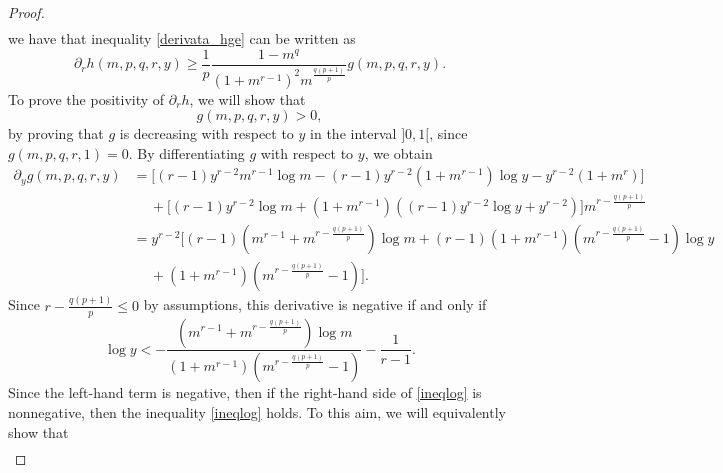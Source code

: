 \documentclass{amsart}
\theoremstyle{definition}
\theoremstyle{remark}
\newcommand{\de}{\partial}
\begin{document}
\begin{proof}
\begin{multline*}
\end{multline*}
we have that inequality \eqref{derivata_hge} can be written as
\begin{equation}\label{derivative_h}
\de_{r}h (m,p,q,r,y) \ge \frac1p\frac{1-m^{q}}{(1+m^{r-1})^{2}m^{\frac {q(p+1)}p}} g(m,p,q,r,y).
\end{equation}
To prove the positivity of $\partial_r h$, we will show that
\begin{equation}
\label{segno_der_g}
g(m,p,q,r,y)>0,
\end{equation}
by proving that $g$ is decreasing with respect to $y$ in the interval $]0,1[$, since $g(m,p,q,r,1)=0$. By differentiating $g$ with respect to $y$, we obtain
\begin{equation*}
\begin{split}
\de_{y}g (m,p,q,r,y)& = \bigg[(r-1)y^{r-2}m^{r-1}\log m-(r-1)y^{r-2}(1+m^{r-1})\log y-y^{r-2}(1+m^{r})\bigg]\\
&\ \quad +\bigg[(r-1)y^{r-2}\log m+(1+m^{r-1})((r-1)y^{r-2}\log y+y^{r-2})\bigg]m^{r-\frac{q(p+1)}p}\\
& =y^{r-2}\bigg[(r-1) (m^{r-1} +m^{r-\frac{q(p+1)}p})\log m+(r-1)(1+m^{r-1})\left(m^{r-\frac{q(p+1)}p}-1\right)\log y  \\
&\ \quad +(1+m^{r-1})\left(m^{r-\frac{q(p+1)}p}-1\right)\bigg].
\end{split}
\end{equation*}
Since $r-\frac{q(p+1)}p\le  0$ by assumptions, this derivative is negative if and only if
\begin{equation}
\label{ineqlog}
\log y < -\frac{\left(m^{r-1}+m^{r-\frac{q(p+1)}p}\right)\log m}{\left(1+m^{r-1}\right)\left(m^{r-\frac{q(p+1)}p}-1\right)}-\frac1{r-1}. %
\end{equation}
Since the left-hand term is negative, then if the right-hand side of \eqref{ineqlog} is nonnegative, then the inequality \eqref{ineqlog} holds.
To this aim, we will equivalently show that
\begin{multline}\label{segno_f}

\end{multline}
\end{proof}
\end{document}
